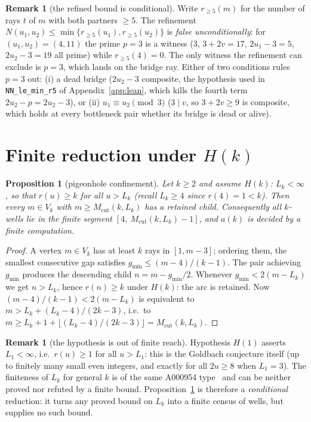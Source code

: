 \documentclass[11pt]{article}
\theoremstyle{plain}
\newtheorem{proposition}[theorem]{Proposition}
\theoremstyle{definition}
\newtheorem{remark}[theorem]{Remark}
\newcommand{\rch}{r}
\newcommand{\Vk}{V_{k}}
\newcommand{\Mcut}{M_{\mathrm{cut}}}
\begin{document}
\begin{remark}[the refined bound is conditional]
\label{rem:condbound}
Write $\rch_{\ge 5}(m)$ for the number of rays $t$ of $m$ with both
partners $\ge 5$. The refinement
$N(u_1,u_2) \le \min\{\rch_{\ge5}(u_1), \rch_{\ge5}(u_2)\}$ is
\emph{false unconditionally}: for $(u_1,u_2) = (4,11)$ the prime
$p = 3$ is a witness ($3$, $3 + 2v = 17$, $2u_1 - 3 = 5$,
$2u_2 - 3 = 19$ all prime) while $\rch_{\ge5}(4) = 0$. The
only witness the refinement can exclude is $p = 3$, which lands on
the bridge ray. Either of two conditions rules $p = 3$ out:
(i) a dead bridge ($2u_2 - 3$ composite, the hypothesis used in
\texttt{NN\_le\_min\_r5} of Appendix~\ref{app:lean}, which kills the
fourth term $2u_2 - p = 2u_2 - 3$), or (ii) $u_1 \equiv u_2
\pmod 3$ ($3 \mid v$, so $3 + 2v \ge 9$ is composite, which holds at
every bottleneck pair whether its bridge is dead or alive).
\end{remark}

\section{Finite reduction under \texorpdfstring{$H(k)$}{H(k)}}
\label{sec:mcut}

\begin{proposition}[pigeonhole confinement]\label{prop:mcut}
Let $k \ge 2$ and assume $H(k)$: $L_k < \infty$, so that
$\rch(u) \ge k$ for all $u > L_k$ (recall $L_k \ge 4$ since
$\rch(4) = 1 < k$). Then every $m \in \Vk$ with
$m \ge \Mcut(k,L_k)$ has a retained child. Consequently all
$k$-wells lie in the finite segment $[4,\ \Mcut(k,L_k) - 1]$, and
$a(k)$ is decided by a finite computation.
\end{proposition}

\begin{proof}
A vertex $m \in \Vk$ has at least $k$ rays in $[1, m-3]$; ordering
them, the smallest consecutive gap satisfies
$g_{\min} \le (m-4)/(k-1)$. The pair achieving $g_{\min}$ produces
the descending child $n = m - g_{\min}/2$. Whenever
$g_{\min} < 2(m - L_k)$ we get $n > L_k$, hence $\rch(n) \ge k$
under $H(k)$: the arc is retained. Now
$(m-4)/(k-1) < 2(m - L_k)$ is equivalent to
$m > L_k + (L_k - 4)/(2k-3)$, i.e.\ to
$m \ge L_k + 1 + \lfloor (L_k-4)/(2k-3) \rfloor = \Mcut(k,L_k)$.
\end{proof}

\begin{remark}[the hypothesis is out of finite reach]
\label{rem:Lk}
Hypothesis $H(1)$ asserts $L_1 < \infty$, i.e.\ $\rch(u) \ge 1$
for all
$u > L_1$: this is the Goldbach conjecture itself (up to finitely
many small even integers, and exactly for all $2u \ge 8$ when
$L_1 = 3$). The finiteness of $L_k$ for general $k$ is of the same
A000954 type~\cite{oeis} and can be neither proved nor refuted by a
finite bound. Proposition~\ref{prop:mcut} is therefore a
\emph{conditional} reduction: it turns any proved bound on $L_k$
into a finite census of wells, but supplies no such bound.
\end{remark}
\end{document}
